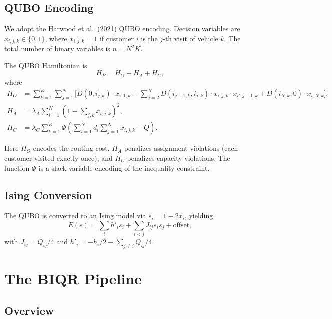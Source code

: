 \documentclass[11pt,a4paper]{article}
\theoremstyle{definition}
\begin{document}
\subsection{QUBO Encoding}\label{sec:qubo}

We adopt the Harwood et al.\ (2021) QUBO encoding. Decision variables are $x_{i,j,k} \in \{0,1\}$, where $x_{i,j,k} = 1$ if customer $i$ is the $j$-th visit of vehicle $k$. The total number of binary variables is $n = N^2 K$.

The QUBO Hamiltonian is
\begin{equation}\label{eq:qubo}
    H_P = H_O + H_A + H_C,
\end{equation}
where
\begin{align}
    H_O &= \sum_{k=1}^{K} \sum_{j=1}^{N} \Big[ D(0,i_{j,k}) \cdot x_{i,1,k} + \sum_{j=2}^{N} D(i_{j-1,k}, i_{j,k}) \cdot x_{i,j,k} \cdot x_{i',j-1,k} + D(i_{N,k},0) \cdot x_{i,N,k} \Big],\\
    H_A &= \lambda_A \sum_{i=1}^{N} \left( 1 - \sum_{j,k} x_{i,j,k} \right)^2,\\
    H_C &= \lambda_C \sum_{k=1}^{K} \Phi\!\left( \sum_{i=1}^{N} d_i \sum_{j=1}^{N} x_{i,j,k} - Q \right).
\end{align}

Here $H_O$ encodes the routing cost, $H_A$ penalizes assignment violations (each customer visited exactly once), and $H_C$ penalizes capacity violations. The function $\Phi$ is a slack-variable encoding of the inequality constraint.

\subsection{Ising Conversion}

The QUBO is converted to an Ising model via $s_i = 1 - 2x_i$, yielding
\begin{equation}
    E(s) = \sum_i h'_i s_i + \sum_{i<j} J_{ij} s_i s_j + \text{offset},
\end{equation}
with $J_{ij} = Q_{ij}/4$ and $h'_i = -h_i/2 - \sum_{j\neq i} Q_{ij}/4$.

\section{The BIQR Pipeline}\label{sec:methodology}

\subsection{Overview}
\end{document}
